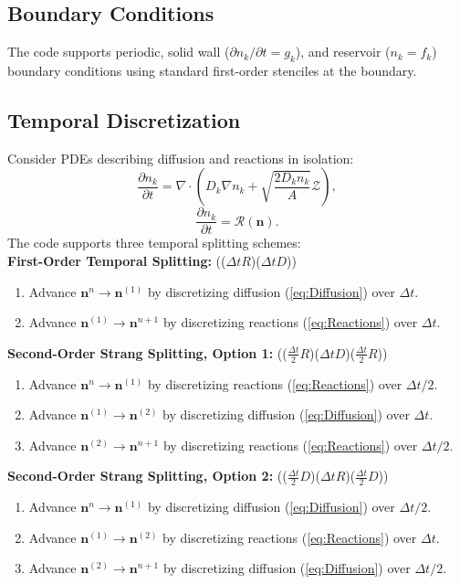 \documentclass[final]{siamltex}
\newcommand{\nb}{\mathbf{n}}
\def\mRb {\bm{\mathcal{R}}}
\def\mZb {\bm{\mathcal{Z}}}
\begin{document}
\subsection{Boundary Conditions}
The code supports periodic, solid wall ($\partial n_k/\partial t = g_k$), and reservoir 
($n_k = f_k$) boundary conditions using standard first-order stenciles at the boundary.

\subsection{Temporal Discretization}
Consider PDEs describing
diffusion and reactions in isolation:
\begin{equation}
\frac{\partial n_k}{\partial t} = \nabla\cdot\left(D_k\nabla n_k + \sqrt{\frac{2D_kn_k}{A}}\mZb\right),\label{eq:Diffusion}
\end{equation}
\begin{equation}
\frac{\partial n_k}{\partial t} = \mRb(\nb).\label{eq:Reactions}
\end{equation}
The code supports three temporal splitting schemes:\\

{\bf First-Order Temporal Splitting:}
(($\Delta t R$)($\Delta t D$))
\begin{enumerate}
\item Advance $\nb^n \rightarrow \nb^{(1)}$ by discretizing 
diffusion (\ref{eq:Diffusion}) over $\Delta t$.
\item Advance $\nb^{(1)} \rightarrow \nb^{n+1}$ by discretizing 
reactions (\ref{eq:Reactions}) over $\Delta t$.
\end{enumerate}

{\bf Second-Order Strang Splitting, Option 1:}
(($\frac{\Delta t}{2}R$)($\Delta t D$)($\frac{\Delta t}{2}R$))
\begin{enumerate}
\item Advance $\nb^n \rightarrow \nb^{(1)}$ by discretizing 
reactions (\ref{eq:Reactions}) over $\Delta t/2$.
\item Advance $\nb^{(1)} \rightarrow \nb^{(2)}$ by discretizing 
diffusion (\ref{eq:Diffusion}) over $\Delta t$.
\item Advance $\nb^{(2)} \rightarrow \nb^{n+1}$ by discretizing 
reactions (\ref{eq:Reactions}) over $\Delta t/2$.
\end{enumerate}

{\bf Second-Order Strang Splitting, Option 2:}
(($\frac{\Delta t}{2}D$)($\Delta t R$)($\frac{\Delta t}{2}D$))
\begin{enumerate}
\item Advance $\nb^n \rightarrow \nb^{(1)}$ by discretizing 
diffusion (\ref{eq:Diffusion}) over $\Delta t/2$.
\item Advance $\nb^{(1)} \rightarrow \nb^{(2)}$ by discretizing 
reactions (\ref{eq:Reactions}) over $\Delta t$.
\item Advance $\nb^{(2)} \rightarrow \nb^{n+1}$ by discretizing 
diffusion (\ref{eq:Diffusion}) over $\Delta t/2$.
\end{enumerate}
\end{document}
